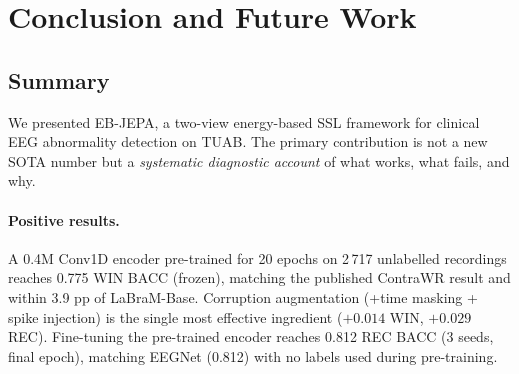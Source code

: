 \documentclass[11pt,a4paper]{article}
\begin{document}

\section{Conclusion and Future Work}
\label{sec:conclusion}

\subsection{Summary}
We presented EB-JEPA, a two-view energy-based SSL framework for clinical EEG
abnormality detection on TUAB.  The primary contribution is not a new SOTA number
but a \emph{systematic diagnostic account} of what works, what fails, and why.

\paragraph{Positive results.}
A 0.4M Conv1D encoder pre-trained for 20 epochs on 2\,717 unlabelled recordings
reaches 0.775 WIN BACC (frozen), matching the published ContraWR result and
within 3.9 pp of LaBraM-Base.  Corruption augmentation (+time masking + spike
injection) is the single most effective ingredient ($+0.014$ WIN, $+0.029$ REC).
Fine-tuning the pre-trained encoder reaches 0.812 REC BACC (3 seeds, final
epoch), matching EEGNet (0.812) with no labels used during pre-training.
\end{document}
